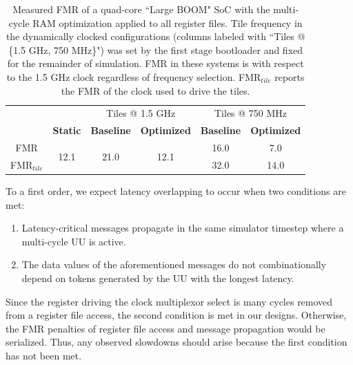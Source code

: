 \begin{table}[t]
\centering
    \begin{tabular}{c c c c c c}

        &                 & \multicolumn{2}{c}{Tiles @ 1.5 GHz} & \multicolumn{2}{c}{Tiles @ 750 MHz} \\
        & \textbf{Static} & \textbf{Baseline} & \textbf{Optimized} & \textbf{Baseline} & \textbf{Optimized} \\
    \hline
          FMR            & \multirow{2}{*}{12.1} & \multirow{2}{*}{21.0}  & \multirow{2}{*}{12.1} & 16.0 & 7.0 \\
          FMR$_{tile}$     &  & & & 32.0 & 14.0 \\
    \hline
    \end{tabular}
    \caption{Measured FMR of a quad-core ``Large BOOM" SoC with the multi-cycle RAM optimization
    applied to all register files. Tile frequency in the dynamically clocked configurations
    (columns labeled with ``Tiles @ \{1.5 GHz, 750 MHz\}") was set by the first stage
    bootloader and fixed for the remainder of simulation. FMR in these systems
    is with respect to the 1.5 GHz clock regardless of frequency selection.
    FMR$_{tile}$ reports the FMR of the clock used to drive the tiles.}
    \label{tbl:pdes-opt-interactions}
\end{table}

To a first order, we expect latency overlapping to occur when two conditions are met:
\begin{enumerate}
\item Latency-critical messages propagate in the same simulator timestep where a multi-cycle UU is active.
\item The data values of the aforementioned messages do not combinationally depend on tokens generated by the UU with the longest latency.
\end{enumerate}
Since the register driving the clock multiplexor select is many cycles removed
from a register file access, the second condition is met in our designs.
Otherwise, the FMR penalties of register file access and message propagation
would be serialized. Thus, any observed slowdowns should arise because the
first condition has not been met.

